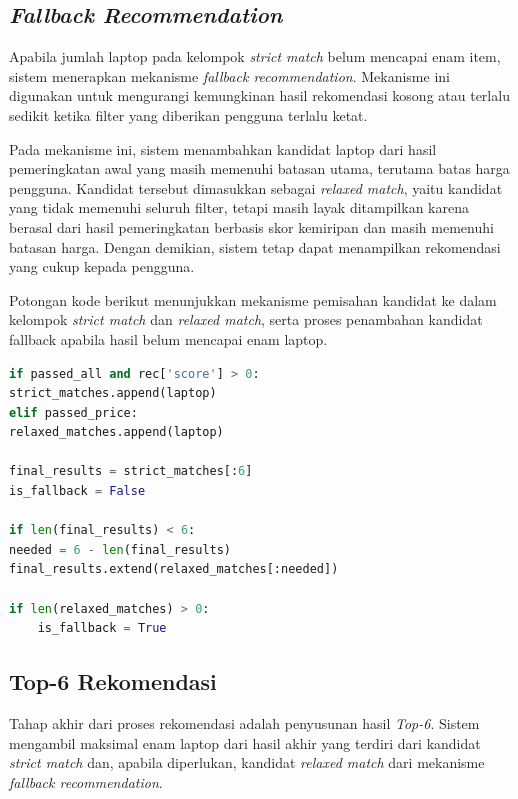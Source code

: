 \subsection{\textit{Fallback Recommendation}}
Apabila jumlah laptop pada kelompok \textit{strict match} belum mencapai enam item, sistem menerapkan mekanisme \textit{fallback recommendation}. Mekanisme ini digunakan untuk mengurangi kemungkinan hasil rekomendasi kosong atau terlalu sedikit ketika filter yang diberikan pengguna terlalu ketat.

Pada mekanisme ini, sistem menambahkan kandidat laptop dari hasil pemeringkatan awal yang masih memenuhi batasan utama, terutama batas harga pengguna. Kandidat tersebut dimasukkan sebagai \textit{relaxed match}, yaitu kandidat yang tidak memenuhi seluruh filter, tetapi masih layak ditampilkan karena berasal dari hasil pemeringkatan berbasis skor kemiripan dan masih memenuhi batasan harga. Dengan demikian, sistem tetap dapat menampilkan rekomendasi yang cukup kepada pengguna.

Potongan kode berikut menunjukkan mekanisme pemisahan kandidat ke dalam kelompok \textit{strict match} dan \textit{relaxed match}, serta proses penambahan kandidat fallback apabila hasil belum mencapai enam laptop.

\begin{lstlisting}[basicstyle=\linespread{0.8}\ttfamily\footnotesize, language=Python, breaklines=true, caption={Potongan Kode Fallback Recommendation}, label=kode:fallback_recommendation]
if passed_all and rec['score'] > 0:
strict_matches.append(laptop)
elif passed_price:
relaxed_matches.append(laptop)

final_results = strict_matches[:6]
is_fallback = False

if len(final_results) < 6:
needed = 6 - len(final_results)
final_results.extend(relaxed_matches[:needed])

if len(relaxed_matches) > 0:
    is_fallback = True
\end{lstlisting}

\subsection{Top-6 Rekomendasi}
Tahap akhir dari proses rekomendasi adalah penyusunan hasil \textit{Top-6}. Sistem mengambil maksimal enam laptop dari hasil akhir yang terdiri dari kandidat \textit{strict match} dan, apabila diperlukan, kandidat \textit{relaxed match} dari mekanisme \textit{fallback recommendation}.

